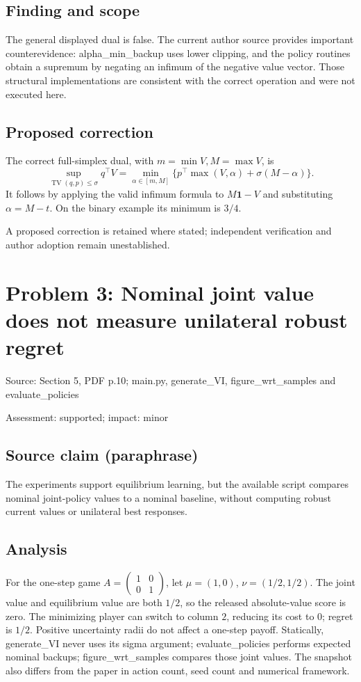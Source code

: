 \documentclass[11pt]{article}
\begin{document}
\subsection*{Finding and scope}

The general displayed dual is false. The current author source provides important counterevidence: alpha\_min\_backup uses lower clipping, and the policy routines obtain a supremum by negating an infimum of the negative value vector. Those structural implementations are consistent with the correct operation and were not executed here.

\subsection*{Proposed correction}

The correct full-simplex dual, with \(m=\min V,M=\max V\), is \[\sup_{\operatorname{TV}(q,p)\le\sigma}q^\top V=\min_{\alpha\in[m,M]}\{p^\top\max(V,\alpha)+\sigma(M-\alpha)\}.\] It follows by applying the valid infimum formula to \(M\mathbf1-V\) and substituting \(\alpha=M-t\). On the binary example its minimum is \(3/4\).

A proposed correction is retained where stated; independent verification and author adoption remain unestablished.

\section*{Problem 3: Nominal joint value does not measure unilateral robust regret}

Source: Section 5, PDF p.10; main.py, generate\_VI, figure\_wrt\_samples and evaluate\_policies

Assessment: supported; impact: minor

\subsection*{Source claim (paraphrase)}

The experiments support equilibrium learning, but the available script compares nominal joint-policy values to a nominal baseline, without computing robust current values or unilateral best responses.

\subsection*{Analysis}

For the one-step game \(A=\begin{pmatrix}1&0\\0&1\end{pmatrix}\), let \(\mu=(1,0)\), \(\nu=(1/2,1/2)\). The joint value and equilibrium value are both \(1/2\), so the released absolute-value score is zero. The minimizing player can switch to column \(2\), reducing its cost to \(0\); regret is \(1/2\). Positive uncertainty radii do not affect a one-step payoff. Statically, generate\_VI never uses its sigma argument; evaluate\_policies performs expected nominal backups; figure\_wrt\_samples compares those joint values. The snapshot also differs from the paper in action count, seed count and numerical framework.
\end{document}
